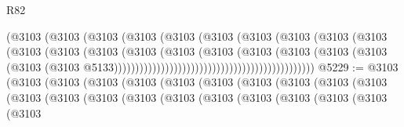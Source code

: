 \begin{lexlean}{R82}
\begin{coremodule}
                                                      (@3103
                                                        (@3103
                                                          (@3103
                                                            (@3103
                                                              (@3103
                                                                (@3103
                                                                  (@3103
                                                                    (@3103
                                                                      (@3103
                                                                        (@3103
                                                                          (@3103
                                                                            (@3103
                                                                              (@3103
                                                                                (@3103
                                                                                  (@3103
                                                                                    (@3103
                                                                                      (@3103
                                                                                        (@3103
                                                                                          (@3103
                                                                                            (@3103
                                                                                              (@3103
                                                                                                (@3103
                                                                                                  @5133)))))))))))))))))))))))))))))))))))))))))))))))
@5229 := @3103
    (@3103
      (@3103
        (@3103
          (@3103
            (@3103
              (@3103
                (@3103
                  (@3103
                    (@3103
                      (@3103
                        (@3103
                          (@3103
                            (@3103
                              (@3103
                                (@3103
                                  (@3103
                                    (@3103
                                      (@3103
                                        (@3103
                                          (@3103
                                            (@3103

\end{coremodule}
\end{lexlean}
